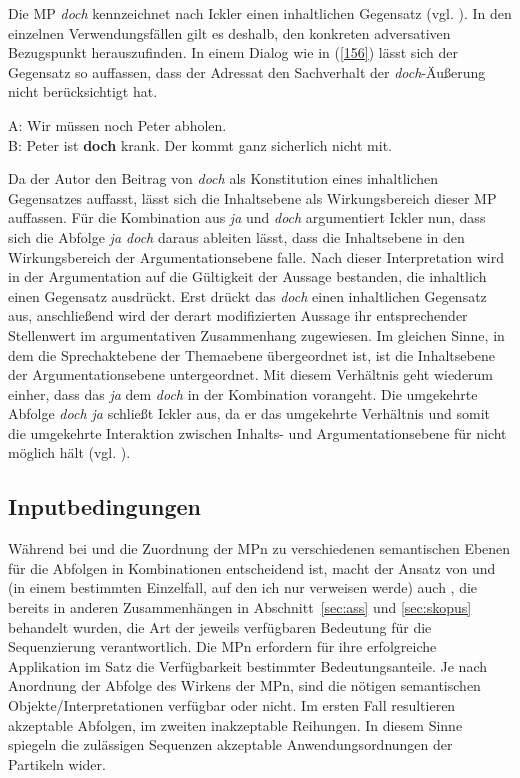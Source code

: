 Die MP \textit{doch} kennzeichnet nach Ickler einen inhaltlichen Gegensatz (vgl. \citeyear[493]{Ickler1994}). In den einzelnen Verwendungsfällen gilt es deshalb, den konkreten adversativen Bezugspunkt herauszufinden. In einem Dialog wie in (\ref{156}) lässt sich der Gegensatz so auffassen, dass der Adressat den Sachverhalt der \textit{doch}-Äußerung nicht berücksichtigt hat.

\begin{exe}
	\ex\label{156} 
	A: Wir müssen noch Peter abholen.\\
	B: Peter ist \textbf{doch} krank. Der kommt ganz sicherlich nicht mit.
\end{exe}
Da der Autor den Beitrag von \textit{doch} als Konstitution eines inhaltlichen Gegensatzes auffasst, lässt sich die Inhaltsebene als Wirkungsbereich dieser MP auffassen. Für die Kombination aus \textit{ja} und \textit{doch} argumentiert Ickler nun, dass sich die Abfolge \textit{ja doch} daraus ableiten lässt, dass die Inhaltsebene in den Wirkungsbereich der Argumentationsebene falle. Nach dieser Interpretation wird in der Argumentation auf die Gültigkeit der Aussage bestanden, die inhaltlich einen Gegensatz ausdrückt. Erst drückt das \textit{doch} einen inhaltlichen Gegensatz aus, anschließend wird der derart modifizierten Aussage ihr entsprechender Stellenwert im argumentativen Zusammenhang zugewiesen. Im gleichen Sinne, in dem die Sprechaktebene der Themaebene übergeordnet ist, ist die Inhaltsebene der Argumentationsebene untergeordnet. Mit diesem Verhältnis geht wiederum einher, dass das \textit{ja} dem \textit{doch} in der Kombination vorangeht. Die umgekehrte Abfolge \textit{doch ja} schließt Ickler aus, da er das umgekehrte Verhältnis und somit die umgekehrte Interaktion zwischen Inhalts- und Argumentationsebene  für  nicht möglich hält (vgl. \citeyear[404]{Ickler1994}).

\subsection{Inputbedingungen}
\label{subsec:input}
Während bei \citet{Vismans1994} und \citet{Ickler1994} die Zuordnung der MPn zu verschiedenen semantischen Ebenen für die Abfolgen in Kombinationen entscheidend ist, macht der Ansatz von \citet{Doherty1985} und (in einem bestimmten Einzelfall, auf den ich nur verweisen werde) auch \citet{Rinas2007}, die bereits in anderen Zusammenhängen in Abschnitt~\ref{sec:ass} und \ref{sec:skopus} behandelt wurden, die Art der jeweils verfügbaren Bedeutung für die Sequenzierung verantwortlich. Die MPn erfordern für ihre erfolgreiche Applikation im Satz die Verfügbarkeit bestimmter Bedeutungsanteile. Je nach Anordnung der Abfolge des Wirkens der MPn, sind die nötigen semantischen Objekte/Interpretationen verfügbar oder nicht. Im ersten Fall resultieren akzeptable Abfolgen, im zweiten inakzeptable Reihungen. In diesem Sinne spiegeln die zulässigen Sequenzen akzeptable Anwendungsordnungen der Partikeln wider.

